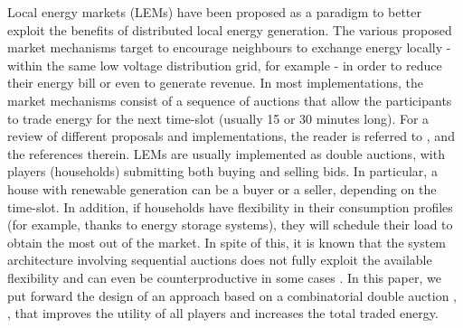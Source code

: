 \documentclass[runningheads]{llncs}
\begin{document}
Local energy markets (LEMs) have been proposed as a paradigm to better exploit the benefits of distributed local energy generation. The various proposed market mechanisms target to encourage  neighbours to exchange energy locally - within the same low voltage distribution grid, for example - in order to reduce their energy bill or even to generate revenue. In most implementations, the market mechanisms consist of a sequence of auctions that allow the participants to trade energy for the next time-slot (usually 15 or 30 minutes long). For a review of different proposals and implementations, the reader is referred to \cite{weinhardt2019far}, \cite{lopez2016methods} and the references therein. 
LEMs are usually implemented as double auctions, with players (households) submitting both buying and selling bids. In particular, a house with renewable generation can be a buyer or a seller, depending on the time-slot. 
In addition, if households have flexibility in their consumption profiles (for example, thanks to energy storage systems), they will schedule their load to obtain the most out of the market. 
In spite of this, it is known that the system architecture involving sequential auctions does not fully exploit the available flexibility and can even be counterproductive in some cases \cite{kok2005powermatcher}. 
In this paper, we put forward the design of an approach based on a combinatorial double auction \cite{LI200959}, \cite{SAMIMI2016201}, \cite{XIA2005239} that improves the utility of all players and increases the total traded energy.



\end{document}
